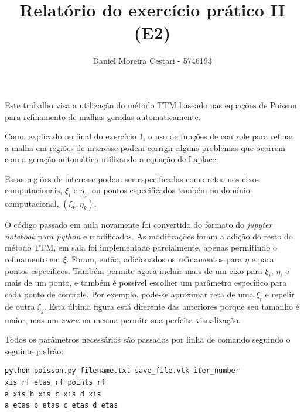\documentclass[a4paper]{article}
\title{Relatório do exercício prático II (E2)}
\author{Daniel Moreira Cestari - 5746193}
\begin{document}
\maketitle



Este trabalho visa a utilização do método TTM baseado nas equações de Poisson para refinamento de malhas geradas automaticamente.

Como explicado no final do exercício 1, o uso de funções de controle para refinar a malha em regiões de interesse podem corrigir alguns problemas que ocorrem com a geração automática utilizando a equação de Laplace.

Essas regiões de interesse podem ser especificadas como retas nos eixos computacionais, $\xi_i$ e $\eta_j$, ou pontos especificados também no domínio computacional, $(\xi_k,\eta_k)$.

O código passado em aula novamente foi convertido do formato do \textit{jupyter notebook} para \textit{python} e modificados. As modificações foram a adição do resto do método TTM, em sala foi implementado parcialmente, apenas permitindo o refinamento em $\xi$. Foram, então, adicionados os refinamentos para $\eta$ e para pontos específicos. Também permite agora incluir mais de um eixo para $\xi_i$, $\eta_i$ e mais de um ponto, e também é possível escolher um parâmetro específico para cada ponto de controle. Por exemplo, pode-se aproximar reta de uma $\xi_i$ e repelir de outra $\xi_j$. Esta última figura está diferente das anteriores porque seu tamanho é maior, mas um \textit{zoom} na mesma permite sua perfeita visualização.

Todos os parâmetros necessários são passados por linha de comando seguindo o seguinte padrão:

\begin{verbatim}
python poisson.py filename.txt save_file.vtk iter_number 
xis_rf etas_rf points_rf 
a_xis b_xis c_xis d_xis 
a_etas b_etas c_etas d_etas
\end{verbatim}
\end{document}
